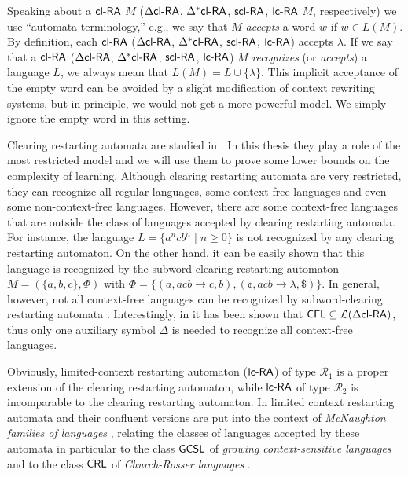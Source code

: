 \begin{remark}\label{remark:lambda}
Speaking about a $\mbox{\sf cl-RA\/}$ $M$ ($\mbox{\sf $\Delta$cl-RA\/}$, $\mbox{\sf $\Delta^*$cl-RA\/}$, $\mbox{\sf scl-RA}$, $\mbox{\sf lc-RA}$ $M$, respectively) we use ``automata terminology,'' e.g., we say that $M$ \emph{accepts} a word $w$ if $w \in L(M)$. By definition, each $\mbox{\sf cl-RA\/}$ ($\mbox{\sf $\Delta$cl-RA\/}$, $\mbox{\sf $\Delta^*$cl-RA\/}$, $\mbox{\sf scl-RA}$, $\mbox{\sf lc-RA}$) accepts $\lambda$. If we say that a $\mbox{\sf cl-RA\/}$ ($\mbox{\sf $\Delta$cl-RA\/}$, $\mbox{\sf $\Delta^*$cl-RA\/}$, $\mbox{\sf scl-RA}$, $\mbox{\sf lc-RA}$) $M$ \emph{recognizes} (or \emph{accepts}) a language $L$, we always mean that $L(M) = L \cup \{\lambda\}$. This implicit acceptance of the empty word can be avoided by a slight modification of context rewriting systems, but in principle, we would not get a more powerful model. We simply ignore the empty word in this setting.
\end{remark}

Clearing restarting automata are studied in \cite{CM10}. In this thesis they play a role of the most restricted model and we will use them to prove some lower bounds on the complexity of learning. Although clearing restarting automata are very restricted, they can recognize all regular languages, some context-free languages and even some non-context-free languages. However, there are some context-free languages that are outside the class of languages accepted by clearing restarting automata. For instance, the language $L = \{a^n c b^n \mid n \ge 0\}$ is not recognized by any clearing restarting automaton. On the other hand, it can be easily shown that this language is recognized by the subword-clearing restarting automaton $M = (\{a, b, c\}, \Phi)$ with $\Phi = \{(a, acb \to c, b), (\cent, acb \to \lambda, \$)\}$. In general, however, not all context-free languages can be recognized by subword-clearing restarting automata \cite{C13}. Interestingly, in \cite{CM11} it has been shown that $\CFL \subseteq \calL{\DclRA}$, thus only one auxiliary symbol $\Delta$ is needed to recognize all context-free languages. 

Obviously, limited-context restarting automaton ($\mbox{\sf lc-RA}$) of type $\mathcal{R}_1$ is a proper extension of the clearing restarting automaton, while $\mbox{\sf lc-RA}$ of type $\mathcal{R}_2$ is incomparable to the clearing restarting automaton. In \cite{OCM13} limited context restarting automata and their confluent versions are put into the context of \emph{McNaughton families of languages} \cite{Beaudry2003}, relating the classes of languages accepted by these automata in particular to the class $\GCSL$ of \emph{growing context-sensitive languages} \cite{Buntrock19981,Dahlhaus1986} and to the class $\CRL$ of \emph{Church-Rosser languages} \cite{MNO88}.

